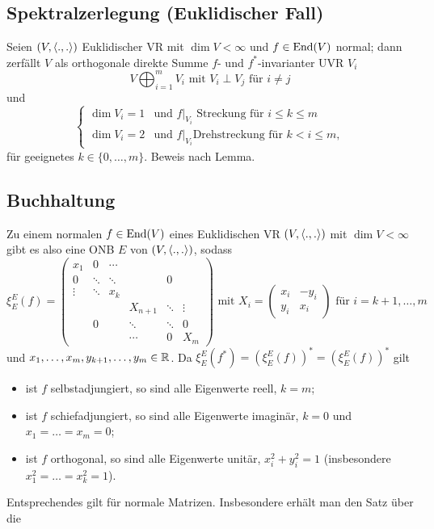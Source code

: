\subsection{Spektralzerlegung (Euklidischer Fall)}
	Seien $ (V,\langle .,. \rangle) $ Euklidischer VR mit $ \dim V <\infty $ und $ f\in \operatorname{End}(V) $ normal; dann zerfällt $ V $ als orthogonale direkte Summe $ f $- und $ f^* $-invarianter UVR $ V_i $
		\[ V\bigoplus_{i=1}^mV_i \text{ mit } V_i\perp V_j \text{ für } i\neq j \]
	und
		\[ \begin{cases}
			\dim V_i = 1& \text{und } f|_{V_i} \text{ Streckung für } i\leq k\leq m\\
			\dim V_i = 2& \text{und } f|_{V_i} \text{Drehstreckung für }k < i\leq m,
		\end{cases} \]
	für geeignetes $ k\in\{0,\dots,m\} $. Beweis nach Lemma.

\subsection{Buchhaltung}
	Zu einem normalen $ f\in \operatorname{End}(V) $ eines Euklidischen VR $ (V,\langle .,. \rangle) $ mit $ \dim V < \infty $
	gibt es also eine ONB $ E $ von $ (V,\langle .,. \rangle) $, sodass 
		\[ \xi_E^E(f) = \begin{pmatrix}
		x_1& 0&\cdots & & &\\
		0 & \ddots & \ddots& & 0& \\
		\vdots & \ddots & x_k& & &\\
		& & & X_{n+1} & \ddots & \vdots\\
		&0 & & \ddots & \ddots & 0\\
		& & & \cdots&0 & X_m
		\end{pmatrix}
		\text{ mit } X_i = \begin{pmatrix}
		x_i & -y_i\\ y_i & x_i
		\end{pmatrix} \text{ für } i=k+1,\dots,m \]
	und $ x_1,\dots,x_m,y_{k+1},\dots,y_m\in \mathbb{R} $. Da $ \xi_E^E(f^*) = (\xi_E^E(f))^* = (\xi_E^E(f))^* $ gilt
		\begin{itemize}
			\item ist $ f $ selbstadjungiert, so sind alle Eigenwerte reell, $ k=m $;
			\item ist $ f $ schiefadjungiert, so sind alle Eigenwerte imaginär, $ k=0 $ und $ x_1=\dots=x_m=0 $;
			\item ist $ f $ orthogonal, so sind alle Eigenwerte unitär, $ x_i^2+y_i^2=1 $ (insbesondere $ x_1^2=\dots=x_k^2=1 $).
		\end{itemize}
	Entsprechendes gilt für normale Matrizen. Insbesondere erhält man den Satz über die
